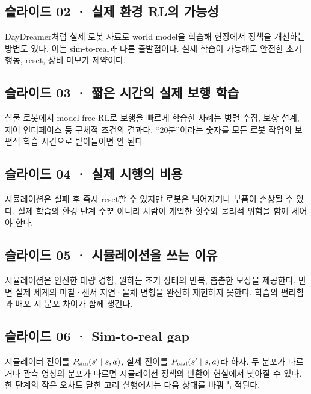 \documentclass[11pt,a4paper]{article}
\begin{document}
\subsection{슬라이드 02 · 실제 환경 RL의 가능성}

DayDreamer처럼 실제 로봇 자료로 world model을 학습해 현장에서 정책을 개선하는 방법도 있다. 이는 sim-to-real과 다른 출발점이다. 실제 학습이 가능해도 안전한 초기 행동, reset, 장비 마모가 제약이다.\par

\subsection{슬라이드 03 · 짧은 시간의 실제 보행 학습}

실물 로봇에서 model-free RL로 보행을 빠르게 학습한 사례는 병렬 수집, 보상 설계, 제어 인터페이스 등 구체적 조건의 결과다. “20분”이라는 숫자를 모든 로봇 작업의 보편적 학습 시간으로 받아들이면 안 된다.\par

\subsection{슬라이드 04 · 실제 시행의 비용}

시뮬레이션은 실패 후 즉시 reset할 수 있지만 로봇은 넘어지거나 부품이 손상될 수 있다. 실제 학습의 환경 단계 수뿐 아니라 사람이 개입한 횟수와 물리적 위험을 함께 세어야 한다.\par

\subsection{슬라이드 05 · 시뮬레이션을 쓰는 이유}

시뮬레이션은 안전한 대량 경험, 원하는 초기 상태의 반복, 촘촘한 보상을 제공한다. 반면 실제 세계의 마찰·센서 지연·물체 변형을 완전히 재현하지 못한다. 학습의 편리함과 배포 시 분포 차이가 함께 생긴다.\par

\subsection{슬라이드 06 · Sim-to-real gap}

시뮬레이터 전이를 $P_{\rm sim}(s'\mid s,a)$, 실제 전이를 $P_{\rm real}(s'\mid s,a)$라 하자. 두 분포가 다르거나 관측 영상의 분포가 다르면 시뮬레이션 정책의 반환이 현실에서 낮아질 수 있다. 한 단계의 작은 오차도 닫힌 고리 실행에서는 다음 상태를 바꿔 누적된다.\par
\end{document}
